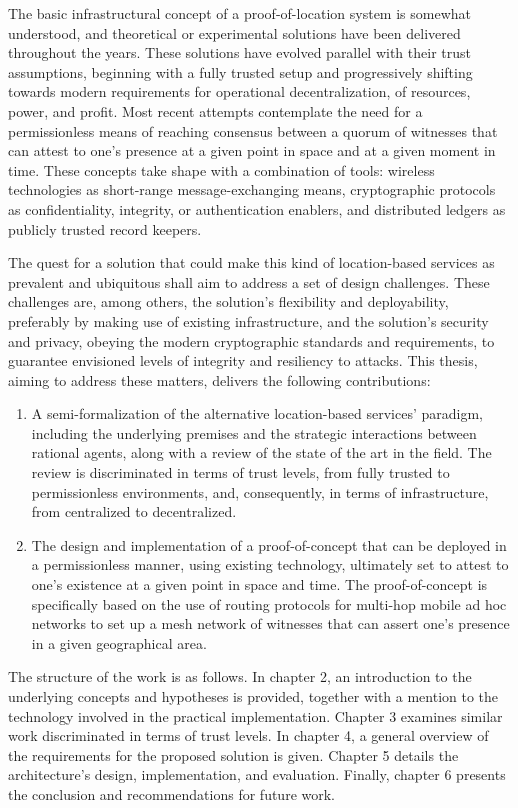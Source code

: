 The basic infrastructural concept of a proof-of-location system is somewhat understood, and theoretical or experimental solutions have been delivered throughout the years. These solutions have evolved parallel with their trust assumptions, beginning with a fully trusted setup and progressively shifting towards modern requirements for operational decentralization, of resources, power, and profit. Most recent attempts contemplate the need for a permissionless means of reaching consensus between a quorum of witnesses that can attest to one's presence at a given point in space and at a given moment in time. These concepts take shape with a combination of tools: wireless technologies as short-range message-exchanging means, cryptographic protocols as confidentiality, integrity, or authentication enablers, and distributed ledgers as publicly trusted record keepers. 

The quest for a solution that could make this kind of location-based services as prevalent and ubiquitous shall aim to address a set of design challenges. These challenges are, among others, the solution's flexibility and deployability, preferably by making use of existing infrastructure, and the solution's security and privacy, obeying the modern cryptographic standards and requirements, to guarantee envisioned levels of integrity and resiliency to attacks. This thesis, aiming to address these matters, delivers the following contributions:
\begin{enumerate}
\item A semi-formalization of the alternative location-based services' paradigm, including the underlying premises and the strategic interactions between rational agents, along with a review of the state of the art in the field. The review is discriminated in terms of trust levels, from fully trusted to permissionless environments, and, consequently, in terms of infrastructure, from centralized to decentralized.
\item The design and implementation of a proof-of-concept that can be deployed in a permissionless manner, using existing technology, ultimately set to attest to one's existence at a given point in space and time. The proof-of-concept is specifically based on the use of routing protocols for multi-hop mobile ad hoc networks to set up a mesh network of witnesses that can assert one's presence in a given geographical area.
\end{enumerate}

The structure of the work is as follows. In chapter 2, an introduction to the underlying concepts and hypotheses is provided, together with a mention to the technology involved in the practical implementation. Chapter 3 examines similar work discriminated in terms of trust levels. In chapter 4, a general overview of the requirements for the proposed solution is given. Chapter 5 details the architecture's design, implementation, and evaluation. Finally, chapter 6 presents the conclusion and recommendations for future work.
